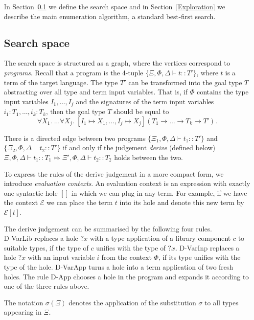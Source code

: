 In Section~\ref{Search space} we define the search space and in Section~\ref{Exploration} we describe the main enumeration algorithm, a standard best-first search.

\subsection{Search space}\label{Search space}
The search space is structured as a graph, where the vertices correspond to \emph{programs}. Recall that a program is the 4-tuple $\{\Xi, \Phi, \Delta \vdash t :: T'\}$, where $t$ is a term of the target language. The type $T'$ can be transformed into the goal type $T$ abstracting over all type and term input variables. That is, if $\Phi$ contains the type input variables $I_1, \ldots, I_j$ and the signatures of the term input variables $i_1 : T_1, \ldots, i_k : T_k$, then the goal type $T$ should be equal to
\[\forall X_1.\; \ldots \forall X_j.\; [I_1 \mapsto X_1, \ldots, I_j \mapsto X_j] (T_1 \rightarrow \ldots \rightarrow T_k \rightarrow T').\]

There is a directed edge between two programs $\{\Xi_1, \Phi, \Delta \vdash t_1 :: T'\}$ and $\{\Xi_2, \Phi, \Delta \vdash t_2 :: T'\}$ if and only if the judgement \emph{derive} (defined below) $\Xi, \Phi, \Delta \vdash t_1 :: T_1 \Mapsto \Xi', \Phi, \Delta \vdash t_2 :: T_2$ holds between the two.

To express the rules of the derive judgement in a more compact form, we introduce \emph{evaluation contexts}. An evaluation context is an expression with exactly one syntactic hole $[]$ in which we can plug in any term. For example, if we have the context $\mathcal{E}$ we can place the term $t$ into its hole and denote this new term by $\mathcal{E}[t]$.

The derive judgement can be summarised by the following four rules.\\
D-VarLib replaces a hole $?x$ with a type application of a library component $c$ to suitable types, if the type of $c$ unifies with the type of $?x$. D-VarInp replaces a hole $?x$ with an input variable $i$ from the context $\Phi$, if its type unifies with the type of the hole. D-VarApp turns a hole into a term application of two fresh holes. The rule D-App chooses a hole in the program and expands it according to one of the three rules above.

The notation $\sigma(\Xi)$ denotes the application of the substitution $\sigma$ to all types appearing in $\Xi$.

